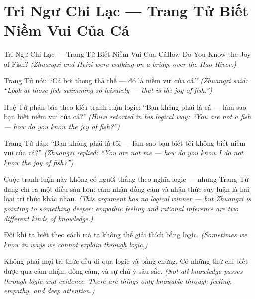 \section{Tri Ngư Chi Lạc — Trang Tử Biết Niềm Vui Của Cá}
\begin{truyen}{Tri Ngư Chi Lạc — Trang Tử Biết Niềm Vui Của Cá}{How Do You Know the Joy of Fish?}
\textit{(Zhuangzi and Huizi were walking on a bridge over the Hao River.)}

Trang Tử nói: ``Cá bơi thong thả thế — đó là niềm vui của cá.''
\textit{(Zhuangzi said: ``Look at those fish swimming so leisurely — that is the joy of fish.'')}

Huệ Tử phản bác theo kiểu tranh luận logic: ``Bạn không phải là cá — làm sao bạn biết niềm vui của cá?''
\textit{(Huizi retorted in his logical way: ``You are not a fish — how do you know the joy of fish?'')}

Trang Tử đáp: ``Bạn không phải là tôi — làm sao bạn biết tôi không biết niềm vui của cá?''
\textit{(Zhuangzi replied: ``You are not me — how do you know I do not know the joy of fish?'')}

Cuộc tranh luận này không có người thắng theo nghĩa logic — nhưng Trang Tử đang chỉ ra một điều sâu hơn: cảm nhận đồng cảm và nhận thức suy luận là hai loại tri thức khác nhau.
\textit{(This argument has no logical winner — but Zhuangzi is pointing to something deeper: empathic feeling and rational inference are two different kinds of knowledge.)}

Đôi khi ta biết theo cách mà ta không thể giải thích bằng logic.
\textit{(Sometimes we know in ways we cannot explain through logic.)}

\end{truyen}

\begin{baihoc}
Không phải mọi tri thức đều đi qua logic và bằng chứng. Có những thứ chỉ biết được qua cảm nhận, đồng cảm, và sự chú ý sâu sắc.
\textit{(Not all knowledge passes through logic and evidence. There are things only knowable through feeling, empathy, and deep attention.)}
\end{baihoc}
\ngancach

